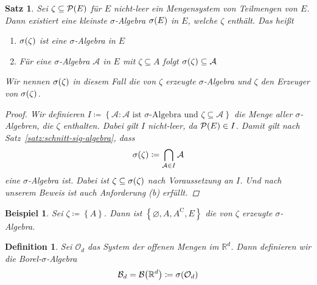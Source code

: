 \documentclass[11pt, twoside, a4paper]{article}
\theoremstyle{plain}
\newtheorem{definition}[blockelement]{Definition}
\newtheorem{satz}[blockelement]{Satz}
\newtheorem{beispiel}[blockelement]{Beispiel}
\numberwithin{equation}{subsection}
\newcommand{\set}[1]{\left\{#1\right\}}
\newcommand{\of}[1]{\mathopen{}\mathclose{}\bgroup\left(#1\aftergroup\egroup\right)}
\renewcommand{\emptyset}{\varnothing}
\newcommand{\comp}[1]{{#1}^{\mathrm{C}}}
\newcommand{\R}{\mathbb{R}}
\begin{document}
    \begin{satz} %
        Sei $\zeta \subseteq \mathcal{P}\of{E}$ für $E$ nicht-leer ein Mengensystem von Teilmengen von $E$. Dann existiert eine kleinste $\sigma$-Algebra $\sigma\of{E}$ in $E$, welche $\zeta$ enthält. Das heißt
        \begin{enumerate}[label=(\alph*)]
            \item $\sigma\of{\zeta}$ ist eine $\sigma$-Algebra in $E$
            \item Für eine $\sigma$-Algebra $\mathcal{A}$ in $E$ mit $\zeta\subseteq A$ folgt $\sigma\of{\zeta} \subseteq \mathcal{A}$
        \end{enumerate}
        Wir nennen $\sigma\of{\zeta}$ in diesem Fall die von $\zeta$ erzeugte $\sigma$-Algebra und $\zeta$ den Erzeuger von $\sigma\of{\zeta}$.
        \begin{proof}
            Wir definieren $I \coloneqq \set{\mathcal{A}: \mathcal{A} \text{ ist $\sigma$-Algebra und } \zeta\subseteq\mathcal{A}}$ die Menge aller $\sigma$-Algebren, die $\zeta$ enthalten. Dabei gilt $I$ nicht-leer, da $\mathcal{P}\of{E}\in I$. Damit gilt nach Satz~\ref{satz:schnitt-sig-algebra}, dass
            \begin{align*}
                \sigma\of{\zeta} \coloneqq \bigcap_{\mathcal{A}\in I} \mathcal{A}
            \end{align*}
            eine $\sigma$-Algebra ist. Dabei ist $\zeta \subseteq \sigma\of{\zeta}$ nach Voraussetzung an $I$. Und nach unserem Beweis ist auch Anforderung (b) erfüllt.
        \end{proof}
    \end{satz}

    \begin{beispiel}
        Sei $\zeta \coloneqq \set{A}$. Dann ist $\set{\emptyset, A, \comp{A}, E}$ die von $\zeta$ erzeugte $\sigma$-Algebra.
    \end{beispiel}

    \begin{definition}
        Sei $\mathcal{O}_d$ das System der offenen Mengen im $\R^d$. Dann definieren wir die \textit{Borel-$\sigma$-Algebra}
        \begin{align*}
            \mathcal{B}_d = \mathcal{B}\of{\R^d} \coloneqq \sigma\of{\mathcal{O}_d}
        \end{align*}
    \end{definition}
\end{document}
